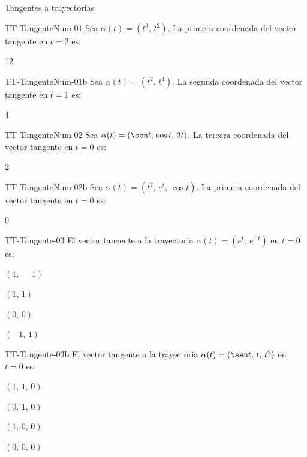 \documentclass[a4,11pt]{aleph-notas}
\begin{document}
\begin{quiz}{Tangentes a trayectorias}
\begin{numerical}[tolerance=0.01]%
    {TT-TangenteNum-01}
    Sea $\alpha(t)=(t^3,\, t^2)$. La primera coordenada del vector tangente en $t=2$ es:
    \item 12
\end{numerical}

\begin{numerical}[tolerance=0.01]%
    {TT-TangenteNum-01b}
    Sea $\alpha(t)=(t^2,\, t^4)$. La segunda coordenada del vector tangente en $t=1$ es:
    \item 4
\end{numerical}

\begin{numerical}[tolerance=0.01]%
    {TT-TangenteNum-02}
    Sea $\alpha(t)=(\sen t,\, \cos t,\, 2t)$. La tercera coordenada del vector tangente en $t=0$ es:
    \item 2
\end{numerical}

\begin{numerical}[tolerance=0.01]%
    {TT-TangenteNum-02b}
    Sea $\alpha(t)=(t^2,\, e^t,\, \cos t)$. La primera coordenada del vector tangente en $t=0$ es:
    \item 0
\end{numerical}

\begin{multi}[]%
    {TT-Tangente-03}
    El vector tangente a la trayectoria $\alpha(t)=(e^t,\, e^{-t})$ en $t=0$ es:
    \item* $(1,\, -1)$
    \item $(1,\, 1)$
    \item $(0,\, 0)$
    \item $(-1,\, 1)$
\end{multi}

\begin{multi}[]%
    {TT-Tangente-03b}
    El vector tangente a la trayectoria $\alpha(t)=(\sen t,\, t,\, t^2)$ en $t=0$ es:
    \item* $(1,\, 1,\, 0)$
    \item $(0,\, 1,\, 0)$
    \item $(1,\, 0,\, 0)$
    \item $(0,\, 0,\, 0)$
\end{multi}

\end{quiz}
\end{document}
